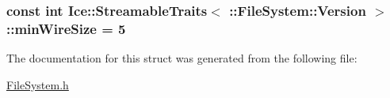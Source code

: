 \subsubsection[{min\+Wire\+Size}]{\setlength{\rightskip}{0pt plus 5cm}const int Ice\+::\+Streamable\+Traits$<$ \+::{\bf File\+System\+::\+Version} $>$\+::min\+Wire\+Size = 5\hspace{0.3cm}{\ttfamily [static]}}\label{struct_ice_1_1_streamable_traits_3_01_1_1_file_system_1_1_version_01_4_ade824a15ad09894f99e4e26e4ea59d12}


The documentation for this struct was generated from the following file\+:\begin{DoxyCompactItemize}
\item 
\hyperlink{_file_system_8h}{File\+System.\+h}\end{DoxyCompactItemize}
